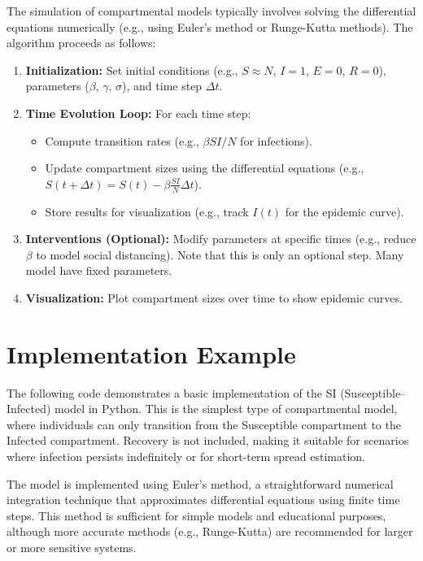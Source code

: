 \documentclass{article}
\begin{document}
The simulation of compartmental models typically involves solving the differential equations numerically (e.g., using Euler’s method or Runge-Kutta methods). The algorithm proceeds as follows:
\begin{enumerate}
    \item \textbf{Initialization:} Set initial conditions (e.g., $S \approx N$, $I = 1$, $E = 0$, $R = 0$), parameters ($\beta$, $\gamma$, $\sigma$), and time step $\Delta t$.
    \item \textbf{Time Evolution Loop:} For each time step:
        \begin{itemize}
            \item Compute transition rates (e.g., $\beta SI/N$ for infections).
            \item Update compartment sizes using the differential equations (e.g., $S(t + \Delta t) = S(t) - \beta \frac{SI}{N} \Delta t$).
            \item Store results for visualization (e.g., track $I(t)$ for the epidemic curve).
        \end{itemize}
    \item \textbf{Interventions (Optional):} Modify parameters at specific times (e.g., reduce $\beta$ to model social distancing). Note that this is only an optional step. Many model have fixed parameters. 
    \item \textbf{Visualization:} Plot compartment sizes over time to show epidemic curves.
\end{enumerate}

\section{ Implementation Example}
The following code demonstrates a basic implementation of the SI (Susceptible–Infected) model in Python. This is the simplest type of compartmental model, where individuals can only transition from the Susceptible compartment to the Infected compartment. Recovery is not included, making it suitable for scenarios where infection persists indefinitely or for short-term spread estimation.

The model is implemented using Euler’s method, a straightforward numerical integration technique that approximates differential equations using finite time steps. This method is sufficient for simple models and educational purposes, although more accurate methods (e.g., Runge-Kutta) are recommended for larger or more sensitive systems.
\end{document}
